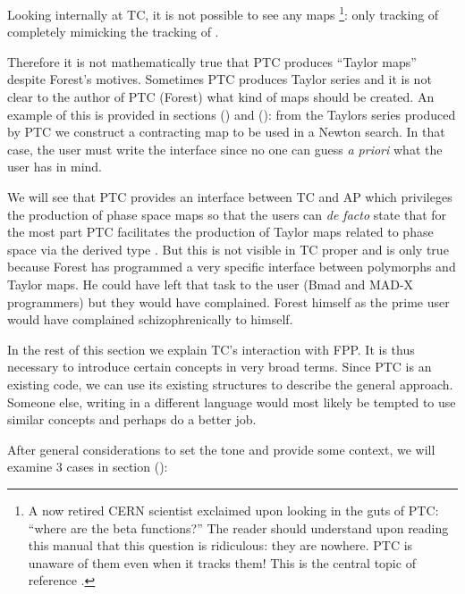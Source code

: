 \documentclass{hitec}     %
\begin{document}
{{{ Looking internally at TC, it is not possible to see any maps \footnote{A now retired CERN scientist exclaimed upon looking in the guts of PTC: ``where are the beta functions?'' The reader should understand upon reading this manual that this question  is ridiculous: they are nowhere. PTC is unaware of them even when it tracks them! This is the central topic of reference \cite{thenewbook}.}: only tracking of  completely mimicking the tracking of .
 
 
Therefore it  is not mathematically true that PTC produces ``Taylor maps'' despite Forest's motives. Sometimes PTC produces Taylor series and it is not clear to the author of PTC (Forest) what kind of maps should be created. An example of this is provided in sections () and (): from the Taylors series produced by PTC we construct a contracting map to be used in a Newton search. In that case, the user must write the interface since no one can guess {\it a priori} what the user has in mind.

 We will see that PTC provides an interface between TC and AP which privileges the production of phase space maps so that the users can {\it de facto} state that for the most part PTC facilitates the production of Taylor maps related to phase space via the derived type . But this is not visible in TC proper and is only true because Forest has programmed a very specific interface between polymorphs and Taylor maps. He could have left that task to the user (Bmad and MAD-X programmers) but they would have complained. Forest himself as the prime user would have complained schizophrenically to himself.
 
 



In the rest of this section we explain TC's interaction with FPP.  It is thus necessary to introduce certain concepts in very broad terms. Since PTC is an existing code, we can use its existing structures to describe the general approach. Someone else, writing in a different language would most likely be tempted to use similar concepts and perhaps do a better job.

After general considerations to set the tone and provide some context, we will examine 3 cases in section ():

}}}
\end{document}

